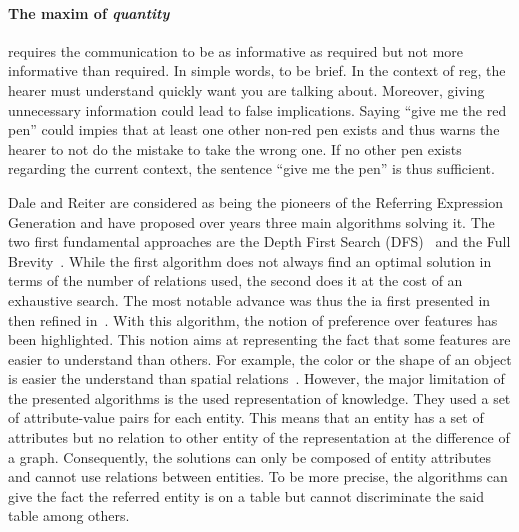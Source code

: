 \paragraph{The maxim of \textit{quantity}} requires the communication to be as informative as required but not more informative than required. In simple words, to be brief. In the context of \acrshort{reg}, the hearer must understand quickly want you are talking about. Moreover, giving unnecessary information could lead to false implications. Saying ``give me the red pen'' could impies that at least one other non-red pen exists and thus warns the hearer to not do the mistake to take the wrong one. If no other pen exists regarding the current context, the sentence ``give me the pen'' is thus sufficient.

Dale and Reiter are considered as being the pioneers of the Referring Expression Generation and have proposed over years three main algorithms solving it. The two first fundamental approaches are the Depth First Search (DFS)~\cite{dale_1989_cooking} and the Full Brevity~\cite{dale_1992_generating}. While the first algorithm does not always find an optimal solution in terms of the number of relations used, the second does it at the cost of an exhaustive search. The most notable advance was thus the \acrfull{ia} first presented in~\cite{reiter_1992_fast} then refined in~\cite{dale_1995_computational}. With this algorithm, the notion of preference over features has been highlighted. This notion aims at representing the fact that some features are easier to understand than others. For example, the color or the shape of an object is easier the understand than spatial relations~\cite{belke_2002_tracking}. However, the major limitation of the presented algorithms is the used representation of knowledge. They used a set of attribute-value pairs for each entity. This means that an entity has a set of attributes but no relation to other entity of the representation at the difference of a graph. Consequently, the solutions can only be composed of entity attributes and cannot use relations between entities. To be more precise, the algorithms can give the fact the referred entity is on a table but cannot discriminate the said table among others.

